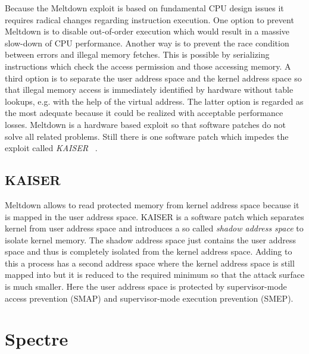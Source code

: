 \documentclass[a4paper,oneside,openright] {scrreprt}
\begin{document}
Because the Meltdown exploit is based on fundamental CPU design issues it requires radical changes regarding instruction execution.
One option to prevent Meltdown is to disable out-of-order execution which would result in a massive slow-down of CPU performance.
Another way is to prevent the race condition between errors and illegal memory fetches. This is possible by serializing instructions
which check the access permission and those accessing memory.
A third option is to separate the user address space and the kernel address space so that illegal memory access is immediately
identified by hardware without table lookups, e.g. with the help of the virtual address.
The latter option is regarded as the most adequate because it could be realized with acceptable performance losses.
Meltdown is a hardware based exploit so that software patches do not solve all related problems. 
Still there is one software patch which impedes the exploit called \textit{KAISER} ~\cite{gruss2017kaslr}.

\subsection{KAISER}
\label{ch:intro:motivation}

Meltdown allows to read protected memory from kernel address space because it is mapped in the user address space.
KAISER is a software patch which separates kernel from user address space and introduces a so called \textit{shadow address space}
to isolate kernel memory. 
The shadow address space just contains the user address space and thus is completely isolated from the kernel address space.
Adding to this a process has a second address space where the kernel address space is still mapped into 
but it is reduced to the required minimum so that the attack surface is much smaller. 
Here the user address space is protected by supervisor-mode access prevention (SMAP) 
and supervisor-mode execution prevention (SMEP).

\section{Spectre}
\label{ch:intro:motivation}
\end{document}
